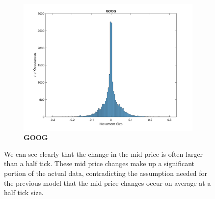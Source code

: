 \begin{figure}[htbp]
\begin{subfigure}[t]{0.49\textwidth}
\end{subfigure}

\begin{subfigure}[t]{0.49\textwidth}
\captionsetup{labelformat=empty}

\caption{\textbf{GOOG}}
\includegraphics[width=\textwidth, trim = 0 0 0 30, clip]{Tick_Histograms/GOOG_TickHist.png}

\end{subfigure}

\caption{\label{fig:tickhist} We can see clearly that the change in the mid price is often larger than a half tick. These mid price changes make up a significant portion of the actual data, contradicting the assumption needed for the previous model that the mid price changes occur on average at a half tick size.}
\end{figure}
